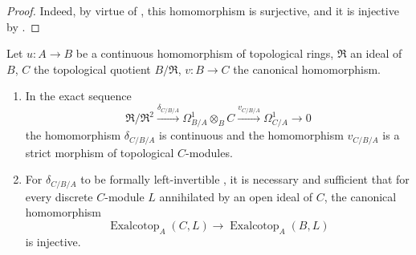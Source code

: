 \begin{proof}
Indeed, by virtue of , this homomorphism is surjective, and it is injective by .
\end{proof}

\begin{proposition}[20.7.8]
\label{0.20.7.8}
Let $u:A\to B$ be a continuous homomorphism of topological rings, $\mathfrak{R}$ an ideal of $B$, $C$ the topological quotient $B/\mathfrak{R}$, $v:B\to C$ the canonical homomorphism.
\begin{enumerate}
  \item[\rm(i)] In the exact sequence 
\[
  \mathfrak{R}/\mathfrak{R}^2\xrightarrow{\delta_{C/B/A}}\Omega^1_{B/A}\otimes_B C\xrightarrow{v_{C/B/A}}\Omega^1_{C/A}\to 0
\]
the homomorphism $\delta_{C/B/A}$ is continuous and the homomorphism $v_{C/B/A}$ is a strict morphism of topological $C$-modules.
  \item[\rm(ii)] For $\delta_{C/B/A}$ to be formally left-invertible , it is necessary and sufficient that for every discrete $C$-module $L$ annihilated by an open ideal of $C$, the canonical homomorphism
\begin{equation}
\tag{20.7.8.1}
  \label{0.20.7.8.1}
  \operatorname{Exalcotop}_A(C,L)\to\operatorname{Exalcotop}_A(B,L)
\end{equation}
is injective.
\end{enumerate}
\end{proposition}

